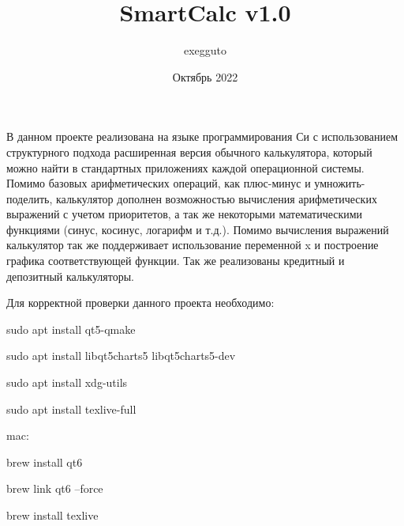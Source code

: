 \documentclass[12pt, letterpaper, twoside]{article}
\title{SmartCalc v1.0}
\author{exegguto}
\date{Октябрь 2022}
\begin{document}
\maketitle

В данном проекте реализована на языке программирования Си с использованием структурного подхода расширенная версия обычного калькулятора, который можно найти в стандартных приложениях каждой операционной системы. Помимо базовых арифметических операций, как плюс-минус и умножить-поделить, калькулятор дополнен возможностью вычисления арифметических выражений с учетом приоритетов, а так же некоторыми математическими функциями (синус, косинус, логарифм и т.д.). Помимо вычисления выражений калькулятор так же поддерживает использование переменной x и построение графика соответствующей функции. Так же реализованы кредитный и депозитный калькуляторы.

Для корректной проверки данного проекта необходимо:

sudo apt install qt5-qmake

sudo apt install libqt5charts5 libqt5charts5-dev

sudo apt install xdg-utils

sudo apt install texlive-full

mac:

brew install qt6

brew link qt6 --force

brew install texlive
\end{document}
